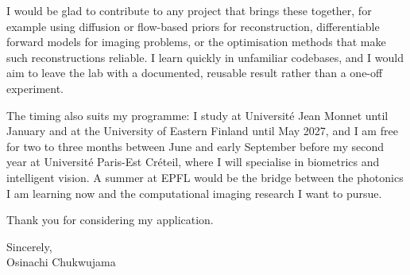 \documentclass[11pt]{article}
\begin{document}
I would be glad to contribute to any project that brings these together, for example using
diffusion or flow-based priors for reconstruction, differentiable forward models for imaging
problems, or the optimisation methods that make such reconstructions reliable. I learn quickly in
unfamiliar codebases, and I would aim to leave the lab with a documented, reusable result rather than
a one-off experiment.

The timing also suits my programme: I study at Université Jean Monnet until January and at the
University of Eastern Finland until May 2027, and I am free for two to three months between June and
early September before my second year at Université Paris-Est Créteil, where I will specialise in
biometrics and intelligent vision. A summer at EPFL would be the bridge between the photonics I am
learning now and the computational imaging research I want to pursue.

Thank you for considering my application.

Sincerely,\\[0.4em]
Osinachi Chukwujama
\end{document}
